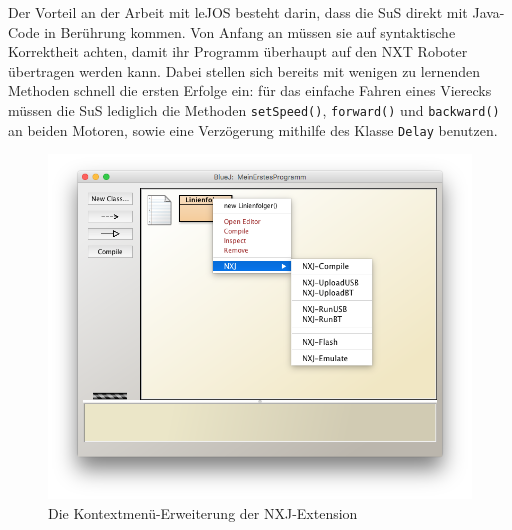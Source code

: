\documentclass[paper=a4, DIV=calc, BCOR=12mm, twoside=on, onecolumn=on, open = right, titlepage =on, parskip =half-, headsepline = on, footsepline = off, chapterprefix = off, appendixprefix = on, fontsize = 12pt, numbers = noenddot, abstract = on]{scrbook}
\begin{document}
Der Vorteil an der Arbeit mit leJOS besteht darin, dass die SuS direkt mit Java-Code in Berührung kommen. Von Anfang an müssen sie auf syntaktische Korrektheit achten, damit ihr Programm überhaupt auf den NXT Roboter übertragen werden kann. Dabei stellen sich bereits mit wenigen zu lernenden Methoden schnell die ersten Erfolge ein: für das einfache Fahren eines Vierecks müssen die SuS lediglich die  Methoden \texttt{setSpeed()}, \texttt{forward()} und \texttt{backward()} an beiden Motoren, sowie eine Verzögerung mithilfe des Klasse \texttt{Delay} benutzen. 

\begin{figure}[htb]
\centering
\includegraphics[width=\textwidth]{images/extension.png}
\caption{Die Kontextmenü-Erweiterung der NXJ-Extension}
\label{fig:extension}
\end{figure}
\end{document}
